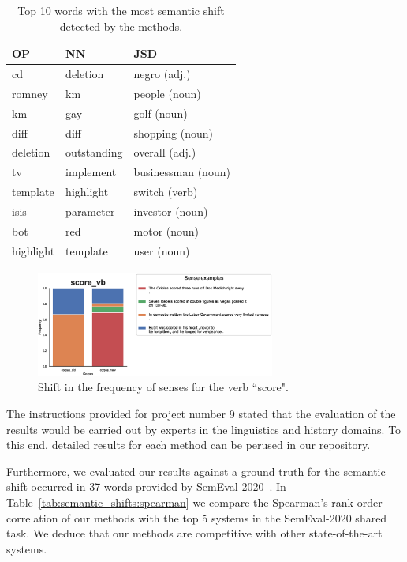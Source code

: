 \documentclass[runningheads]{llncs}
\begin{document}
\begin{table}
    \caption{Top 10 words with the most semantic shift detected by the methods.}
    \label{tab:semantic_shifts:top_words}
    \centering
    \begin{tabular}{lll}
        \toprule
        OP & NN & JSD \\
        \midrule
        cd & deletion & negro (adj.) \\
        romney & km & people (noun) \\
        km & gay & golf (noun) \\
        diff & diff & shopping (noun)  \\
        deletion & outstanding & overall (adj.) \\
        tv & implement & businessman (noun) \\
        template & highlight & switch (verb) \\
        isis & parameter & investor (noun) \\
        bot & red & motor (noun) \\
        highlight & template & user (noun) \\
        \bottomrule
    \end{tabular}
\end{table}

\begin{figure}
    \center
    \includegraphics[width=0.7\textwidth]{img/33_score_vb.eps}
    \caption{Shift in the frequency of senses for the verb “score".} 
    \label{fig:semantic_shifts:score}
\end{figure}

The instructions provided for project number 9 stated that the evaluation of the results would be carried out by experts in the linguistics and history domains. To this end, detailed results for each method can be perused in our repository.

Furthermore, we evaluated our results against a ground truth for the semantic shift occurred in 37 words provided by SemEval-2020~\cite{schlechtweg-etal-2020-semeval}. In Table~\ref{tab:semantic_shifts:spearman} we compare the Spearman's rank-order correlation of our methods with the top 5 systems in the SemEval-2020 shared task. We deduce that our methods are competitive with other state-of-the-art systems.
\end{document}
